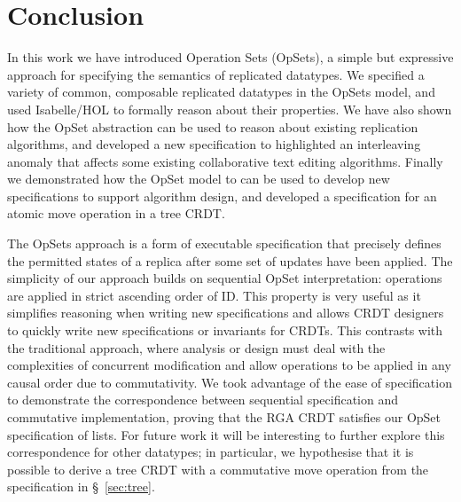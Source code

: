 \documentclass[11pt]{article}
\begin{document}
\section{Conclusion}

In this work we have introduced Operation Sets (OpSets), a simple but expressive approach for specifying the semantics of replicated datatypes.
We specified a variety of common, composable replicated datatypes in the OpSets model, and used Isabelle/HOL to formally reason about their properties.
We have also shown how the OpSet abstraction can be used to reason about existing replication algorithms, and developed a new specification to highlighted an interleaving anomaly that affects some existing collaborative text editing algorithms.
Finally we demonstrated how the OpSet model to can be used to develop new specifications to support algorithm design, and developed a specification for an atomic move operation in a tree CRDT.

The OpSets approach is a form of executable specification that precisely defines the permitted states of a replica after some set of updates have been applied.
The simplicity of our approach builds on sequential OpSet interpretation: operations are applied in strict ascending order of ID.
This property is very useful as it simplifies reasoning when writing new specifications and allows CRDT designers to quickly write new specifications or invariants for CRDTs.
This contrasts with the traditional approach, where analysis or design must deal with the complexities of concurrent modification and allow operations to be applied in any causal order due to commutativity.
We took advantage of the ease of specification to demonstrate the correspondence between sequential specification and commutative implementation, proving that the RGA CRDT satisfies our OpSet specification of lists.
For future work it will be interesting to further explore this correspondence for other datatypes; in particular, we hypothesise that it is possible to derive a tree CRDT with a commutative move operation from the specification in \S~\ref{sec:tree}.

\end{document}

